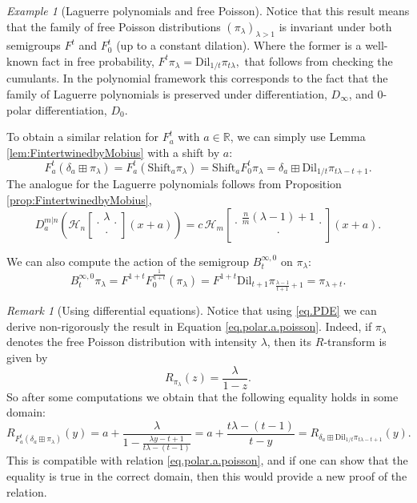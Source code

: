\documentclass[reqno,11pt]{amsart}
\theoremstyle{remark}
\newtheorem{remark}[theorem]{Remark}
\newtheorem{example}[theorem]{Example}
\newcommand{\rr}{\mathbb{R}}
\newcommand{\dil}[1]{\mbox{Dil}_{#1}}
\newcommand{\shift}[1]{\mbox{Shift}_{#1}}
\newcommand*\HGP[3]{%
 \mathcal{H}_{#1}{\left[\genfrac..{0pt}{1}{#2}{#3}\right]}%
}
\newcommand{\polar}[1]{D_{#1}}
\newcommand{\polars}[3]{D_{#1}^{#2|#3}}
\newcommand{\freepower}[1]{F^{#1}}
\newcommand{\pfreepower}[2]{F_{#1}^{#2}}
\begin{document}
\begin{example}[Laguerre polynomials and free Poisson]
Notice that this result means that the family of free Poisson distributions $(\pi_\lambda)_{\lambda > 1}$ is invariant under both semigroups $\freepower{t}$ and $ \pfreepower{0}{t}$ (up to a constant dilation). Where the former is a well-known fact in free probability, $\freepower{t} \pi_\lambda= \dil{1/t} \pi_{t\lambda},$
that follows from checking the cumulants. In the polynomial framework this corresponds to the fact that the family of Laguerre polynomials is preserved under differentiation, $\polar{\infty}$, and 0-polar differentiation, $\polar{0}$.

To obtain a similar relation for $\pfreepower{a}{t}$ with $a\in \rr$, we can simply use Lemma \ref{lem:FintertwinedbyMobius} with a shift by $a$:
\begin{equation}
\label{eq.polar.a.poisson} 
F_a^t ( \delta_a \boxplus \pi_{\lambda} ) =F_a^t ( \shift{a} \pi_{\lambda} ) = \shift{a} F_0^t\pi_{\lambda} = \delta_a \boxplus \dil{1/t} \pi_{ {t\lambda -t +1} }.
\end{equation}
The analogue for the Laguerre polynomials follows from Proposition \ref{prop:FintertwinedbyMobius},
$$\polars{a}{m}{n}\left(\HGP{n}{\lambda}{\cdot}(x+a) \right)=c \, \HGP{m}{\frac{n}{m}(\lambda-1)+1}{\cdot}(x+a).$$

We can also compute the action of the semigroup $B_{t}^{\infty,0}$ on $\pi_\lambda$:
$$  B^{\infty,0}_t\pi_{\lambda} =  \freepower{1+t}\pfreepower{0}{\tfrac{1}{1+t}}( \pi_{\lambda} )=\freepower{1+t}  \dil{t+1} \pi_{ \tfrac{\lambda-1}{t+1}+1 } = \pi_{ \lambda+t}. $$
\end{example}

\begin{remark}[Using differential equations] 
Notice that using \eqref{eq.PDE} we can derive non-rigorously the result in Equation \eqref{eq.polar.a.poisson}. Indeed, if $ \pi_\lambda $ denotes the free Poisson distribution with intensity $\lambda$, then its $R$-transform is given by
$$ R_{ \pi_\lambda }(z) = \frac{\lambda}{1-z}.$$
So after some computations we obtain that the following equality holds in some domain:
$$ R_{F_a^t ( \delta_a \boxplus \pi_{\lambda} )}(y) = a+\frac{\lambda}{ 1- \frac{\lambda y-t+1}{t\lambda - (t-1)}  } = a+\frac{  t\lambda-(t-1) }{t-y}= R_{\delta_a \boxplus \dil{1/t} \pi_{ t\lambda -t +1}  }(y). $$
This is compatible with relation \eqref{eq.polar.a.poisson}, and if one can show that the equality is true in the correct domain, then this would provide a new proof of the relation.
\end{remark} 
\end{document}
